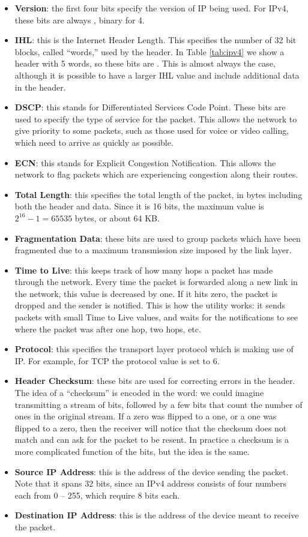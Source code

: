\begin{itemize}
    \item \textbf{Version}: the first four bits specify the version of IP being used. For IPv4, these bits are always , binary for 4.
    \item \textbf{IHL}: this is the Internet Header Length. This specifies the number of 32 bit blocks, called ``words,'' used by the header. In Table \ref{tab:ipv4} we show a header with 5 words, so these bits are . This is almost always the case, although it is possible to have a larger IHL value and include additional data in the header.
    \item \textbf{DSCP}: this stands for Differentiated Services Code Point. These bits are used to specify the type of service for the packet. This allows the network to give priority to some packets, such as those used for voice or video calling, which need to arrive as quickly as possible.
    \item \textbf{ECN}: this stands for Explicit Congestion Notification. This allows the network to flag packets which are experiencing congestion along their routes.
    \item \textbf{Total Length}: this specifies the total length of the packet, in bytes including both the header and data. Since it is 16 bits, the maximum value is $2^{16}-1 = 65535$ bytes, or about 64 KB.
    \item \textbf{Fragmentation Data}: these bits are used to group packets which have been fragmented due to a maximum transmission size imposed by the link layer.
    \item \textbf{Time to Live}: this keeps track of how many hops a packet has made through the network. Every time the packet is forwarded along a new link in the network, this value is decreased by one. If it hits zero, the packet is dropped and the sender is notified. This is how the  utility works: it sends packets with small Time to Live values, and waits for the notifications to see where the packet was after one hop, two hops, etc.
    \item \textbf{Protocol}: this specifies the transport layer protocol which is making use of IP. For example, for TCP the protocol value is set to 6.
    \item \textbf{Header Checksum}: these bits are used for correcting errors in the header. The idea of a ``checksum'' is encoded in the word: we could imagine transmitting a stream of bits, followed by a few bits that count the number of ones in the original stream. If a zero was flipped to a one, or a one was flipped to a zero, then the receiver will notice that the checksum does not match and can ask for the packet to be resent. In practice a checksum is a more complicated function of the bits, but the idea is the same.
    \item \textbf{Source IP Address}: this is the address of the device sending the packet. Note that it spans 32 bits, since an IPv4 address consists of four numbers each from 0 -- 255, which require 8 bits each.
    \item \textbf{Destination IP Address}: this is the address of the device meant to receive the packet.
\end{itemize}


